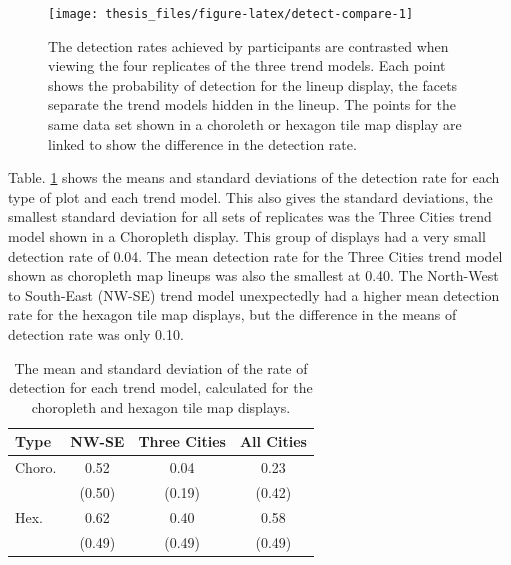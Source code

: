 \documentclass{monashthesis}
\begin{document}
\begin{figure}

{\centering \texttt{[image: thesis\_files/figure-latex/detect-compare-1]} 

}

\caption{The detection rates achieved by participants are contrasted when viewing the four replicates of the three trend models. Each point shows the probability of detection for the lineup display, the facets separate the trend models hidden in the lineup. The points for the same data set shown in a choroleth or hexagon tile map display are linked to show the difference in the detection rate.}\label{fig:detect-compare}
\end{figure}

Table. \ref{tab:desc-stats} shows the means and standard deviations of the detection rate for each type of plot and each trend model. This also gives the standard deviations, the smallest standard deviation for all sets of replicates was the Three Cities trend model shown in a Choropleth display. This group of displays had a very small detection rate of 0.04. The mean detection rate for the Three Cities trend model shown as choropleth map lineups was also the smallest at 0.40.
The North-West to South-East (NW-SE) trend model unexpectedly had a higher mean detection rate for the hexagon tile map displays, but the difference in the means of detection rate was only 0.10.

\begin{table}[!h]

\caption{\label{tab:desc-stats}The mean and standard deviation of the rate of detection for each trend model, calculated for the choropleth and hexagon tile map displays.}
\centering
\begin{tabular}[t]{lccc}
\toprule
Type & NW-SE & Three Cities & All Cities\\
\midrule
Choro. & 0.52 & 0.04 & 0.23\\
 & (0.50) & (0.19) & (0.42)\\
\addlinespace
Hex. & 0.62 & 0.40 & 0.58\\
 & (0.49) & (0.49) & (0.49)\\
\bottomrule
\end{tabular}
\end{table}
\end{document}
